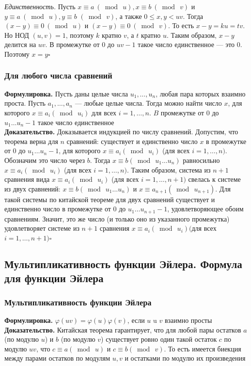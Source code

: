 \documentclass[a4paper]{article}
\newcommand{\qed}{\hfill$\square$}
\begin{document}
\textit{Единственность.} Пусть $x \equiv a\ (\bmod\ u), x \equiv b\ (\bmod\ v)$ и $y \equiv a\ (\bmod\ u), y \equiv b$ $(\bmod\ v)$, а также $0 \leqslant x, y<u v$. Тогда $(x-y) \equiv 0\ (\bmod\ u)$ и $(x-y) \equiv 0\ (\bmod\ v)$. То есть $x-y=k u=t v$. Но НОД $(u, v)=1$, поэтому $k$ кратно $v$, а $t$ кратно $u$. Таким образом, $x-y$ делится на $u v$. В промежутке от 0 до $u v-1$ такое число единственное — это 0. Поэтому $x=y$\qed


\subsubsection*{Для любого числа сравнений}
\textbf{Формулировка.} Пусть даны целые числа $u_{1}, \ldots, u_{n}$, любая пара которых взаимно проста. Пусть $a_{1}, \ldots, a_{n}$ — любые целые числа. Тогда можно найти число $x$, для которого $x \equiv a_{i}\left(\bmod\ u_{i}\right)$ для всех $i=1, \ldots, n$. $B$ промежутке от 0 до $u_{1} \ldots u_{n}-1$ такое число единственное\\[2mm]
\indent\textbf{Доказательство.} Доказывается индукцией по числу сравнений. Допустим, что теорема верна для $n$ сравнений: существует и единственно число 
$x$ в промежутке от 0 до $u_{1} \ldots u_{n}-1$, для которого $x \equiv a_{i}\left(\bmod\ u_{i}\right)$ (для всех $i=1, \ldots, n)$. Обозначим это число через $b$. 
Тогда $x \equiv b\left(\bmod\ u_{1} \ldots u_{n}\right)$ равносильно $x \equiv a_{i}\left(\bmod\ u_{i}\right)$ (для всех $i=1, \ldots, n)$. Таким образом, 
система из $n+1$ сравнения вида $x \equiv a_{i}\left(\bmod\ u_{i}\right)$ (для всех $i=1, \ldots, n+1)$ свелась к системе из двух сравнений: 
$x \equiv b\left(\bmod\ u_{1} \ldots u_{n}\right)$ и $x \equiv a_{n+1}\left(\bmod\ u_{n+1}\right)$. 
Для такой системы по китайской теореме для двух сравнений существует и единственно число в промежутке от 0 до $u_{1} \ldots u_{n+1}-1$, 
удовлетворяющее обоим сравнениям. Значит, это же число (и только оно из указанного промежутка) удовлетворяет системе из $n+1$ сравнения 
$x \equiv a_{i}\left(\bmod\ u_{i}\right)($для всех $i=1, \ldots, n+1)$\qed



\subsection{Мультипликативность функции Эйлера. Формула для функции Эйлера}
\subsubsection*{Мультипликативность функции Эйлера}
\textbf{Формулировка.} $\varphi(u v)=\varphi(u) \varphi(v)$, если $u$ u $v$ взаимно просты\\[2mm]
\indent\textbf{Доказательство.} Китайская теорема гарантирует, что для любой пары остатков $a$ (по модулю $u$) и $b$ (по модулю $v$) 
существует ровно один такой остаток $c$ по модулю $u v$, что $c \equiv a(\bmod\ u)$ и $c \equiv b(\bmod\ v)$. То есть имеется биекция между 
парами остатков по модулям $u, v$ и остатками по модулю их произведения
\end{document}
